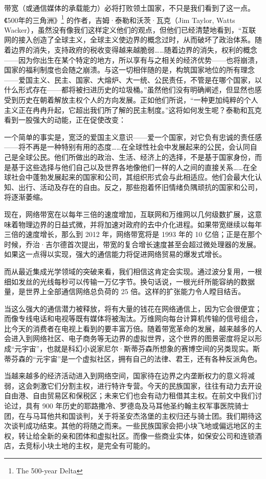 带宽（或通信媒体的承载能力）必将打败领土国家，不只是我们看到了这一点。《500年的三角洲》\footnote{The 500-year Delta} 的作者，吉姆·泰勒和沃茨·瓦克（Jim Taylor, Watts Wacker），虽然没有像我们这样定义他们的观点，但他们已经清楚地看到，“互联网的接入创造了全球主义，全球主义使边界的概念过时，从而破坏了政治体系。随着边界的消失，支持政府的税收变得越来越脆弱……随着边界的消失，权利的概念——因为你出生在某个特定的地方，所以享有与之相关的经济优势——也将崩溃，国家的福利制度也会随之崩溃。与这一切相伴随的是，构筑国家地位的所有理念——爱国主义、民主、国家、大熔炉、大一统、公民责任，不管是在哪个国家，以什么形式存在——都将被扫进历史的垃圾桶。”虽然他们没有明确阐述，但显然也感受到历史在朝着解放主权个人的方向发展。正如他们所说，“一种更加纯粹的个人主义正在冉冉升起，它超出我们所了解的民主制度。”这将如何发生呢？泰勒和瓦克看到一股强大的动能，正在促使改变：

\begin{tcolorbox}
\kaishu 一个简单的事实是，宽泛的爱国主义意识——爱一个国家，对它负有忠诚的责任感——将不再是一种特别有用的态度……在全球性社会中发展起来的公民，会认同自己是全球公民。他们所做出的政治、生活、经济上的选择，不是基于国家身份，而是基于这些选择与他们自己以及世界各地像他们一样的人之间的直接关系……在全球社会中蓬勃发展起来的国家和公司，其组织形式会与此相适应。他们会最大化认知、出行、活动及存在的自由。反之，那些抱着怀旧情绪负隅顽抗的国家和公司，将逐渐萎缩。
\end{tcolorbox}

现在，网络带宽在以每年三倍的速度增加，互联网和万维网以几何级数扩展，这意味着物理边界的日益式微，并将加速对政府的去中介化进程。如果带宽继续以每年三倍的速度增长，那么到 2012 年，网络带宽将是 1993 年的 10 亿倍；正是在那个时候，乔治·吉尔德首次提出，带宽的复合增长速度甚至会超过微处理器的发展。如果这一点得以实现，强大的通信能力将促进网络贸易的爆发式增长。

而从最近集成光学领域的突破来看，我们相信这肯定会实现。通过波分复用，一根细如发丝的光线每秒可以传输一万亿字节。换句话说，一根光纤所能容纳的数据量，是世界上全部通信网络总负荷的 25 倍。这样的扩张能力令人瞠目结舌。

当这么强大的通信潜力被释放，将有大量的钱花在网络通信上，因为它会很便宜；而像专线电话和电视等既有媒体将被淘汰。万维网向每台计算机传输的信号组合，比今天的消费者在电视上看到的要丰富万倍。随着带宽革命的发展，越来越多的人会进入到网络社区、电子商务等无边界的虚拟世界，这个世界的图景密度将足以形成“元宇宙”，也就是科幻小说家尼尔·斯蒂芬森所想象的赛博空间的另类现实。斯蒂芬森的“元宇宙”是一个虚拟社区，拥有自己的法律、君王，还有各种反派角色。

当越来越多的经济活动进入到网络空间，国家待在边界之内垄断权力的意义将减弱，这会刺激它们分割主权，进行特许专营。今天的民族国家，往往有动力去开设自由港、自由贸易区和保税区；未来它们也会有动力租借其主权。在前文中我们讨论过，具有 900 年历史的耶路撒冷、罗德岛及马耳他圣约翰主权军事医院骑士团，在与马耳他共和国谈判，关于将圣安杰洛堡的主权归还与骑士团。我们期待这次谈判成功结束。其他的将随之而来。一些民族国家会把小块飞地或偏远地区的主权，转让给全新的亲和团体和虚拟社区。而像一些商业实体，如保安公司和连锁酒店，去竞标小块土地的主权，是完全有可能的。

